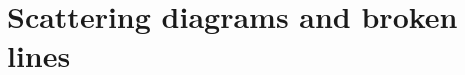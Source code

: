 \documentclass[11pt]{amsart}
\newtheorem{theorem}{Theorem}[section]
\theoremstyle{remark}
\numberwithin{equation}{section}
\newcommand{\ZZ}{\mathbb{Z}}
\begin{document}
%
%
%


\section{Scattering diagrams and broken lines}
\end{document}

